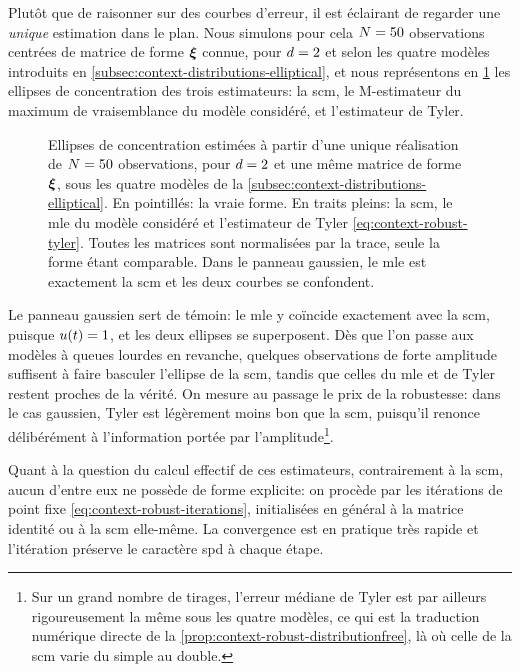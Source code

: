 Plutôt que de raisonner sur des courbes d'erreur, il est éclairant de regarder une \emph{unique} estimation dans le plan. Nous simulons pour cela $N=50$ observations centrées de matrice de forme $\boldsymbol{\xi}$ connue, pour $d=2$ et selon les quatre modèles introduits en \cref{subsec:context-distributions-elliptical}, et nous représentons en \cref{fig:context-robust-scmvstyler} les ellipses de concentration des trois estimateurs: la scm, le M-estimateur du maximum de vraisemblance du modèle considéré, et l'estimateur de Tyler.

\begin{figure}[h]
  \begin{center}
    
  \end{center}
  \provScmvstylerQR[.5cm]
  \caption{Ellipses de concentration estimées à partir d'une unique réalisation de $N=50$ observations, pour $d=2$ et une même matrice de forme $\boldsymbol{\xi}$, sous les quatre modèles de la \cref{subsec:context-distributions-elliptical}. En pointillés: la vraie forme. En traits pleins: la scm, le mle du modèle considéré et l'estimateur de Tyler \cref{eq:context-robust-tyler}. Toutes les matrices sont normalisées par la trace, seule la forme étant comparable. Dans le panneau gaussien, le mle est exactement la scm et les deux courbes se confondent. \provScmvstyler}
  \label{fig:context-robust-scmvstyler}
\end{figure}


Le panneau gaussien sert de témoin: le mle y coïncide exactement avec la scm, puisque $u(t)=1$, et les deux ellipses se superposent. Dès que l'on passe aux modèles à queues lourdes en revanche, quelques observations de forte amplitude suffisent à faire basculer l'ellipse de la scm, tandis que celles du mle et de Tyler restent proches de la vérité. On mesure au passage le prix de la robustesse: dans le cas gaussien, Tyler est légèrement moins bon que la scm, puisqu'il renonce délibérément à l'information portée par l'amplitude\footnote{Sur un grand nombre de tirages, l'erreur médiane de Tyler est par ailleurs rigoureusement la même sous les quatre modèles, ce qui est la traduction numérique directe de la \cref{prop:context-robust-distributionfree}, là où celle de la scm varie du simple au double.}.



Quant à la question du calcul effectif de ces estimateurs, contrairement à la scm, aucun d'entre eux ne possède de forme explicite: on procède par les itérations de point fixe \cref{eq:context-robust-iterations}, initialisées en général à la matrice identité ou à la scm elle-même. La convergence est en pratique très rapide et l'itération préserve le caractère spd à chaque étape. \\


